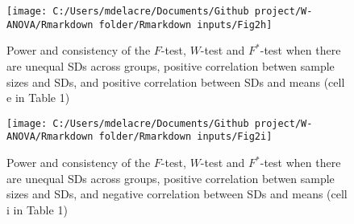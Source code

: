 \documentclass[
  english,
  man]{apa6}
\begin{document}
\newpage
\begin{landscape}

\begin{figure}

{\centering \texttt{[image: C:/Users/mdelacre/Documents/Github project/W-ANOVA/Rmarkdown folder/Rmarkdown inputs/Fig2h]} 

}

\caption{Power and consistency of the $F$-test, $W$-test and $F^*$-test when there are unequal SDs across groups, positive correlation betwen sample sizes and SDs, and positive correlation between SDs and means (cell e  in Table 1)}\label{fig:Fig17}
\end{figure}

\end{landscape}
\newpage
\begin{landscape}

\begin{figure}

{\centering \texttt{[image: C:/Users/mdelacre/Documents/Github project/W-ANOVA/Rmarkdown folder/Rmarkdown inputs/Fig2i]} 

}

\caption{Power and consistency of the $F$-test, $W$-test and $F^*$-test when there are unequal SDs across groups, positive correlation betwen sample sizes and SDs, and negative correlation between SDs and means (cell i  in Table 1)}\label{fig:Fig18}
\end{figure}

\end{landscape}
\newpage
\end{document}
